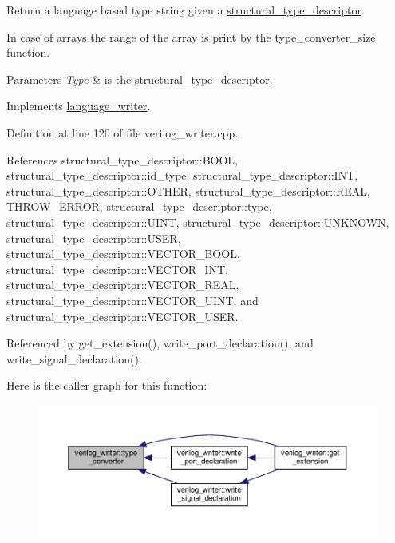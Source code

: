 Return a language based type string given a \hyperlink{structstructural__type__descriptor}{structural\+\_\+type\+\_\+descriptor}. 

In case of arrays the range of the array is print by the type\+\_\+converter\+\_\+size function. 
\begin{DoxyParams}{Parameters}
{\em Type} & is the \hyperlink{structstructural__type__descriptor}{structural\+\_\+type\+\_\+descriptor}. \\
\hline
\end{DoxyParams}


Implements \hyperlink{classlanguage__writer_a1ac884fda2f8990edf61f914af7b04dd}{language\+\_\+writer}.



Definition at line 120 of file verilog\+\_\+writer.\+cpp.



References structural\+\_\+type\+\_\+descriptor\+::\+B\+O\+OL, structural\+\_\+type\+\_\+descriptor\+::id\+\_\+type, structural\+\_\+type\+\_\+descriptor\+::\+I\+NT, structural\+\_\+type\+\_\+descriptor\+::\+O\+T\+H\+ER, structural\+\_\+type\+\_\+descriptor\+::\+R\+E\+AL, T\+H\+R\+O\+W\+\_\+\+E\+R\+R\+OR, structural\+\_\+type\+\_\+descriptor\+::type, structural\+\_\+type\+\_\+descriptor\+::\+U\+I\+NT, structural\+\_\+type\+\_\+descriptor\+::\+U\+N\+K\+N\+O\+WN, structural\+\_\+type\+\_\+descriptor\+::\+U\+S\+ER, structural\+\_\+type\+\_\+descriptor\+::\+V\+E\+C\+T\+O\+R\+\_\+\+B\+O\+OL, structural\+\_\+type\+\_\+descriptor\+::\+V\+E\+C\+T\+O\+R\+\_\+\+I\+NT, structural\+\_\+type\+\_\+descriptor\+::\+V\+E\+C\+T\+O\+R\+\_\+\+R\+E\+AL, structural\+\_\+type\+\_\+descriptor\+::\+V\+E\+C\+T\+O\+R\+\_\+\+U\+I\+NT, and structural\+\_\+type\+\_\+descriptor\+::\+V\+E\+C\+T\+O\+R\+\_\+\+U\+S\+ER.



Referenced by get\+\_\+extension(), write\+\_\+port\+\_\+declaration(), and write\+\_\+signal\+\_\+declaration().

Here is the caller graph for this function\+:
\nopagebreak
\begin{figure}[H]
\begin{center}
\leavevmode
\includegraphics[width=350pt]{d8/dba/classverilog__writer_a20595dc1f543de374aeb4ec2f577971d_icgraph}
\end{center}
\end{figure}
\mbox{\label{classverilog__writer_aa7a775e57ed2f7d4d613352bd239a279}} 
